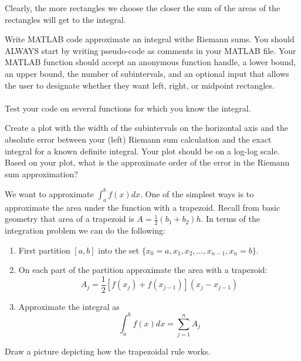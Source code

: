 Clearly, the more rectangles we choose the closer the sum of the areas of the rectangles will get to the integral.
\begin{problem}
    Write MATLAB code approximate an integral withe Riemann sums. You should ALWAYS start by writing pseudo-code as comments in your
    MATLAB file.    Your MATLAB function
    should accept an anonymous function handle, a lower bound, an upper bound, the number
    of subintervals, and an optional input that allows the user to designate whether they
    want left, right, or midpoint rectangles. \\
     \\
    Test your code on several functions for which you know the integral.
\end{problem}

\begin{problem}
    Create a plot with the width of the subintervals on the horizontal axis and the
    absolute error between your (left) Riemann sum calculation and the exact integral for
    a known definite integral.  Your plot should be on a log-log scale.  Based on your
    plot, what is the approximate order of the error in the Riemann sum approximation?
\end{problem}

\begin{problem}
    We want to approximate $\displaystyle \int_a^b f(x) dx$.  One of the simplest ways is
    to approximate the area under the function with a trapezoid.  Recall from basic
    geometry that area of a
    trapezoid is $A = \frac{1}{2} (b_1 + b_2) h$.  In terms of the integration problem we
    can do the following:
    \begin{enumerate}
        \item First partition $[a,b]$ into the set $\{x_0=a, x_1, x_2, \ldots, x_{n-1},
        x_n=b\}$.
        \item On each part of the partition approximate the area with a trapezoid:
            \[ A_j = \frac{1}{2} \left[ f(x_j) + f(x_{j-1}) \right]\left(
            x_j - x_{j-1} \right) \]
        \item Approximate the integral as
            \[ \int_a^b f(x) dx = \sum_{j=1}^n A_j \]
    \end{enumerate}
    Draw a picture depicting how the trapezoidal rule works.
\end{problem}


